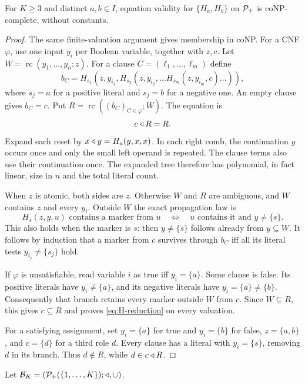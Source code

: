 \begin{proposition}\label{thm:H-hardness}
For $K\geq3$ and distinct $a,b\in I$, equation validity for
$\{H_a,H_b\}$ on $\mathcal P_+$ is coNP-complete, without constants.
\end{proposition}
\begin{proof}
The same finite-valuation argument gives membership in coNP.
For a CNF $\varphi$, use one input $y_i$ per Boolean variable, together
with $z,c$. Let $W=\operatorname{rc}(y_1,\ldots,y_n;z)$.
For a clause $C=(\ell_1,\ldots,\ell_m)$ define
\[
 b_C=H_{s_1}(z,y_{i_1},H_{s_2}(z,y_{i_2},\ldots
                  H_{s_m}(z,y_{i_m},c)\ldots)),
\]
where $s_j=a$ for a positive literal and $s_j=b$ for a negative one.
An empty clause gives $b_C=c$. Put
$R=\operatorname{rc}((b_C)_{C\in\varphi};W)$. The equation is
\begin{equation}\label{eq:H-reduction}
 c\mathbin{\triangleleft} R=R.
\end{equation}
Expand each reset by $x\mathbin{\triangleleft} y=H_a(y,x,x)$. In each right comb, the
continuation $y$ occurs once and only the small left operand is
repeated. The clause terms also use their continuation once. The
expanded tree therefore has polynomial, in fact linear, size in
$n$ and the total literal count.

When $z$ is atomic, both sides are $z$. Otherwise $W$ and $R$ are
ambiguous, and $W$ contains $z$ and every $y_i$. Outside $W$ the
exact propagation law is
\[
 H_s(z,y,u)\text{ contains a marker from }u
 \quad\Longleftrightarrow\quad
 u\text{ contains it and }y\ne\{s\}.
\]
This also holds when the marker is $s$: then $y\ne\{s\}$ follows
already from $y\subseteq W$. It follows by induction that a marker
from $c$ survives through $b_C$ iff all its literal tests
$y_{i_j}\ne\{s_j\}$ hold.

If $\varphi$ is unsatisfiable, read variable $i$ as true iff
$y_i=\{a\}$. Some clause is false. Its positive literals have
$y_i\ne\{a\}$, and its negative literals have $y_i=\{a\}\ne\{b\}$.
Consequently that branch retains every marker outside $W$ from $c$.
Since $W\subseteq R$, this gives $c\subseteq R$ and proves
\eqref{eq:H-reduction} on every valuation.

For a satisfying assignment, set $y_i=\{a\}$ for true and
$y_i=\{b\}$ for false, $z=\{a,b\}$, and $c=\{d\}$ for a third
role $d$. Every clause has a literal with $y_i=\{s\}$, removing
$d$ in its branch. Thus $d\notin R$, while $d\in c\mathbin{\triangleleft} R$.
\end{proof}

Let $\mathcal B_K=(\mathcal P_+(\{1,\ldots,K\});\mathbin{\triangleleft},\cup)$.

